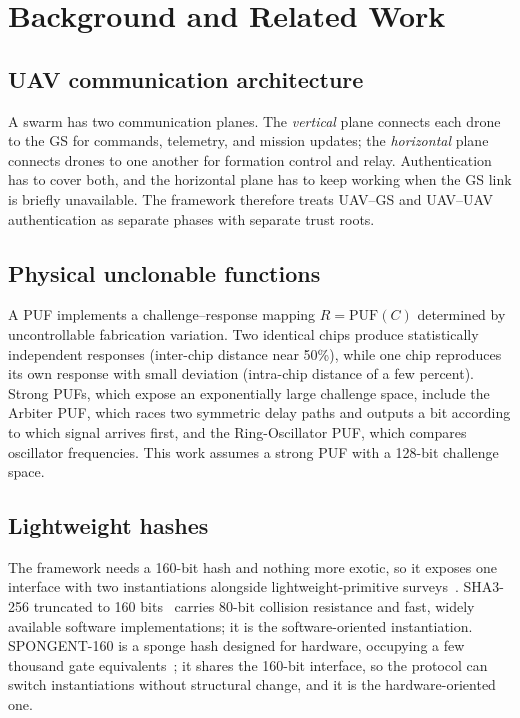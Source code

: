 \documentclass[journal]{IEEEtran}
\begin{document}
\section{Background and Related Work}
\label{sec:related}

\subsection{UAV communication architecture}

A swarm has two communication planes. The \emph{vertical} plane connects each
drone to the GS for commands, telemetry, and mission updates; the
\emph{horizontal} plane connects drones to one another for formation control
and relay. Authentication has to cover both, and the horizontal plane has to
keep working when the GS link is briefly unavailable. The framework therefore
treats UAV--GS and UAV--UAV authentication as separate phases with separate
trust roots.

\subsection{Physical unclonable functions}

A PUF implements a challenge--response mapping $R = \mathrm{PUF}(C)$ determined
by uncontrollable fabrication variation. Two identical chips produce
statistically independent responses (inter-chip distance near 50\%), while one
chip reproduces its own response with small deviation (intra-chip distance of a
few percent). Strong PUFs, which expose an exponentially large challenge space,
include the Arbiter PUF, which races two symmetric delay paths and outputs a bit
according to which signal arrives first, and the Ring-Oscillator PUF, which
compares oscillator frequencies. This work assumes a strong PUF with a 128-bit
challenge space.

\subsection{Lightweight hashes}

The framework needs a 160-bit hash and nothing more exotic, so it exposes one
interface with two instantiations alongside lightweight-primitive
surveys~\cite{lightweight_crypto_evaluation}. SHA3-256 truncated to 160
bits~\cite{sha3_standard,keccak_team} carries 80-bit collision resistance and
fast, widely available software implementations; it is the software-oriented
instantiation. SPONGENT-160 is a sponge hash designed for hardware, occupying a
few thousand gate equivalents~\cite{spongent_original}; it shares the 160-bit
interface, so the protocol can switch instantiations without structural change,
and it is the hardware-oriented one.
\end{document}
